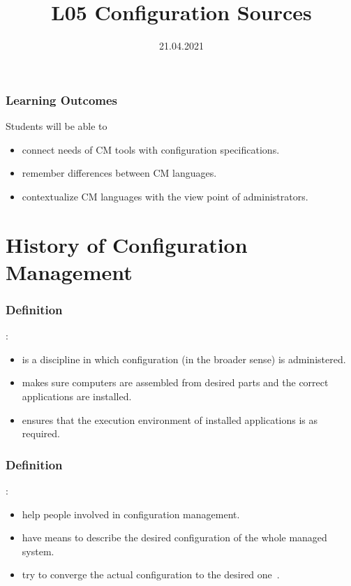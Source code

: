 

\title{L05 Configuration Sources}
\date{21.04.2021}



\begin{frame}
	\frametitle{Learning Outcomes}
	Students will be able to
	\begin{itemize}
	\item connect needs of CM tools with configuration specifications.
	\item remember differences between CM languages.
	\item contextualize CM languages with the view point of administrators.
	\end{itemize}
\end{frame}


\section{History of Configuration Management}

\begin{frame}
	\frametitle{Definition}

	:

	\begin{itemize}
	\item is a discipline in which configuration (in the broader sense) is administered.
	\item makes sure computers are assembled from desired parts and the correct applications are installed.
	\item ensures that the execution environment of installed applications is as required.%
	\end{itemize}
\end{frame}


\begin{frame}
	\frametitle{Definition}

	:

	\pause

	\begin{itemize}
	\item help people involved in configuration management.
	\item have means to describe the desired configuration of the whole managed system.
	\item try to converge the actual configuration to the desired one~\cite{burgess1995cfengine}.
	\end{itemize}
\end{frame}


